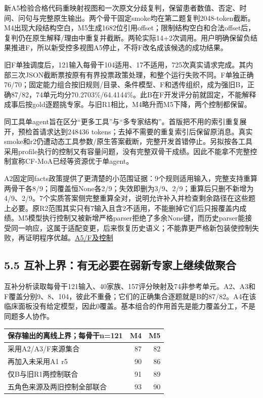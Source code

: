 \documentclass[
  11pt,
  a4paper,
]{article}
\newcounter{none} %
\begin{document}
新A5检验合格代码重映射视图和一次原文分歧复判，保留患者数值、否定、时间、问句与完整原生输出。两个骨干固定smoke均在第二题复判2048-token截断。M4出现大段结构空白，M5生成1682位引用offset；限制结构空白和合法offset后，复判仍在原生解释/理由中重复并截断。两轮实际14+2次调用。用户明确保留负结果推进F，所以新受控多视图A5停止，不将F改名成该候选的成功结果。

旧F单独调度后，121输入每骨干104适用、17不适用，725次真实请求完成。其内部三次JSON截断票按原有有界投票政策处理，和整个运行失败不同。F单独正确76/70；固定能力组合按旧规则/目录、条件模型、F和透传组织，成为强旧B，正确87/82，74单元均分70.2703\%/64.4144\%。此B在F开发评分前就固定，不能解释成事后按gold逐题挑专家。与旧R1相比，M4略升而M5下降，两个控制都保留。

同工具单agent旨在区分``更多工具''与``多专家结构''。首版把不用的索引重复展开，预检首请求达到248436
tokens；去掉不需要的重复索引后保留原消息。真实smoke和r2仍遭动态工具参数/原生答案截断，完整开发首错停止。另拟按各工具采用profile执行的控制又有容量问题，没有完整双骨干成绩。因此不能拿不完整控制宣称CF-MoA已经等资源优于单agent。

A2固定同facts政策提供了更清楚的小范围证据：9个规则适用输入，完整支持重算两骨干各8/9；同覆盖恒None各2/9；失效即删为3/9、2/9；重算后只删不新增为4/9、2/9。7个实质答案侧完整重算全对，说明允许补入并检查剩余路径在这些题上必要。原R2范围其实只有7输入且含2不适用，不能删掉它们后只报覆盖内成绩。M5模型执行控制又被新增严格parser拒绝了多余None键，而历史parser能接受同一响应，这属于适配变更，后来恢复历史语义；不能靠更严格新包装使控制失败，再证明程序优越。\href{https://github.com/xiotakut/cf_mrg/blob/main/papers/2026-10-02_cf_moa/author_dossier/records/research/cf_moa_experiment_report.md\#L338}{A5/F及控制}

\subsection{5.5
互补上界：有无必要在弱新专家上继续做聚合}\label{ux4e92ux8865ux4e0aux754cux6709ux65e0ux5fc5ux8981ux5728ux5f31ux65b0ux4e13ux5bb6ux4e0aux7ee7ux7eedux505aux805aux5408}

互补分析读取每骨干121输入、40家族、157评分映射及74非参考单元。A2、A3和F覆盖分别9、8、104，彼此不重叠；它们的正确集合逐题就是B的87/82。A4在该临床面板没有给定模型，因此0覆盖。基本组合的作用首先是能力覆盖分工，不是同题多人协作。

{\def\LTcaptype{none} %
\begin{longtable}[]{@{}lrr@{}}
\toprule\noalign{}
保存输出的离线上界；每骨干n=121 & M4 & M5 \\
\midrule\noalign{}
\endhead
\bottomrule\noalign{}
\endlastfoot
采用A2/A3/F来源集合 & 87 & 82 \\
再加入未采用A1 r5 & 90 & 86 \\
仅B与旧R1两控制联合 & 91 & 89 \\
五角色来源及两旧控制全部联合 & 93 & 90 \\
\end{longtable}
}
\end{document}
